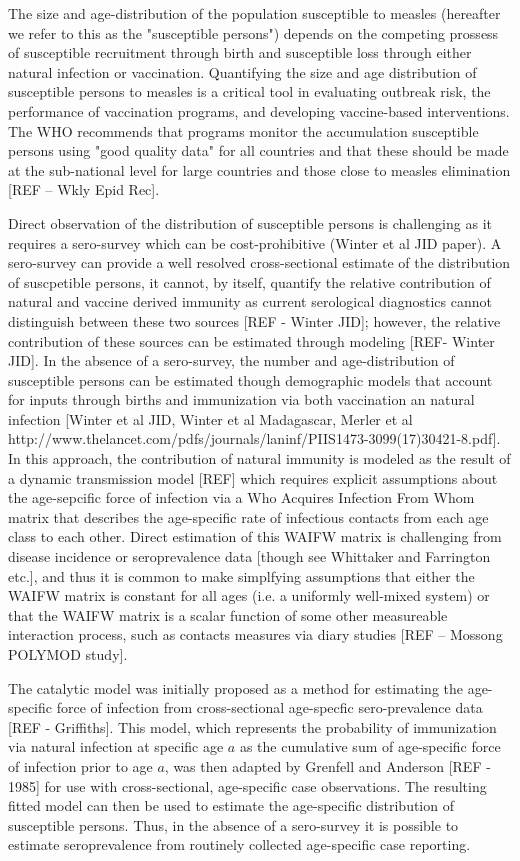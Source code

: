 \documentclass[nofootinbib,aps,pre,twocolumn,superscriptaddress,showkeys,showpacs]{revtex4-1}
\begin{document}
The size and age-distribution of the population susceptible to measles (hereafter we refer to this as the "susceptible persons") depends on the competing prossess of susceptible recruitment through birth and susceptible loss through either natural infection or vaccination. 
Quantifying the size and age distribution of susceptible persons to measles is a critical tool in evaluating outbreak risk, the performance of vaccination programs, and developing vaccine-based interventions. 
The WHO recommends that programs monitor the accumulation susceptible persons using "good quality data" for all countries and that these should be made at the sub-national level for large countries and those close to measles elimination [REF -- Wkly Epid Rec].

Direct observation of the distribution of susceptible persons is challenging as it requires a sero-survey which can be cost-prohibitive (Winter et al JID paper). 
A sero-survey can provide a well resolved cross-sectional estimate of the distribution of suscpetible persons, it cannot, by itself, quantify the relative contribution of natural and vaccine derived immunity as current serological diagnostics cannot distinguish between these two sources [REF - Winter JID]; however, the relative contribution of these sources can be estimated through modeling [REF- Winter JID].
In the absence of a sero-survey, the number and age-distribution of susceptible persons can be estimated though demographic models that account for inputs through births and immunization via both vaccination an natural infection [Winter et al JID, Winter et al Madagascar, Merler et al http://www.thelancet.com/pdfs/journals/laninf/PIIS1473-3099(17)30421-8.pdf]. In this approach, the contribution of natural immunity is modeled as the result of a dynamic transmission model [REF] which requires explicit assumptions about the age-sepcific force of infection via a Who Acquires Infection From Whom matrix that describes the age-specific rate of infectious contacts from each age class to each other.  Direct estimation of this WAIFW matrix is challenging from disease incidence or seroprevalence data [though see Whittaker and Farrington etc.], and thus it is common to make simplfying assumptions that either the WAIFW matrix is constant for all ages (i.e. a uniformly well-mixed system) or that the WAIFW matrix is a scalar function of some other measureable interaction process, such as contacts measures via diary studies [REF -- Mossong POLYMOD study].

The catalytic model was initially proposed as a method for estimating the age-specific force of infection from cross-sectional age-specfic sero-prevalence data [REF - Griffiths]. 
This model, which represents the probability of immunization via natural infection at specific age $a$ as the cumulative sum of age-specific force of infection prior to age $a$, was then adapted by Grenfell and Anderson [REF - 1985] for use with cross-sectional, age-specific case observations.  
The resulting fitted model can then be used to estimate the age-specific distribution of susceptible persons.
Thus, in the absence of a sero-survey it is possible to estimate seroprevalence from routinely collected age-specific case reporting.
\end{document}
